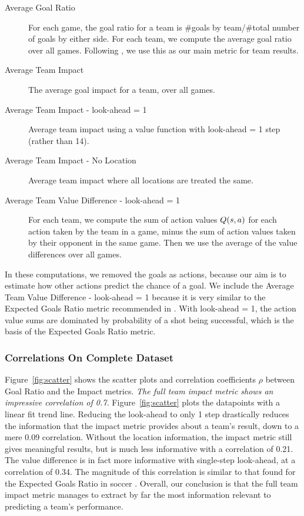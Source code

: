 \begin{description}
\item[Average Goal Ratio] For each game, the goal ratio for a team is \#goals by team/\#total number of goals by either side. For each team, we compute the average goal ratio over all games. Following \citep{Tegen2015}, we use this as our main metric for team results.  
\item[Average Team Impact] The average goal impact for a team, over all games.
\item[Average Team Impact - look-ahead = 1] Average team impact using a value function with look-ahead = 1 step (rather than 14). 
\item[Average Team Impact - No Location] Average team impact where all locations are treated the same.
\item[Average Team Value Difference - look-ahead = 1] For each team, we compute the sum of action values $Q(s,a)$ for each action taken by the team in a game, minus the sum of action values taken by their opponent in the same game. Then we use the average of the value differences over all games.
\end{description}

In these computations, we removed the goals as actions, because our aim is to estimate how other actions predict the chance of a goal. We include the Average Team Value Difference - look-ahead = 1 because it is very similar to the Expected Goals Ratio metric recommended in \citep{Tegen2015}. With look-ahead = 1, the action value sums are dominated by probability of a shot being successful, which is the basis of the Expected Goals Ratio metric.  

\subsubsection{Correlations On Complete Dataset}

Figure~\ref{fig:scatter} shows the scatter plots and correlation coefficients $\rho$ between Goal Ratio and the Impact metrics. {\em The full team impact metric shows an impressive correlation of 0.7.}  Figure~\ref{fig:scatter} plots the datapoints with a linear fit trend line.
%
%
Reducing the look-ahead to only 1 step drastically reduces the information that the impact metric provides about a team's result, down to a mere 0.09 correlation. Without the location information, the impact metric still gives meaningful results, but is much less informative with a correlation of 0.21. The value difference is in fact more informative with single-step look-ahead, at a correlation of 0.34. The magnitude of this correlation is similar to that found for the Expected Goals Ratio in soccer \citep{Tegen2015,Graphs2015}. Overall, our conclusion is that the full team impact metric manages to extract by far the most information relevant to predicting a team's performance.

